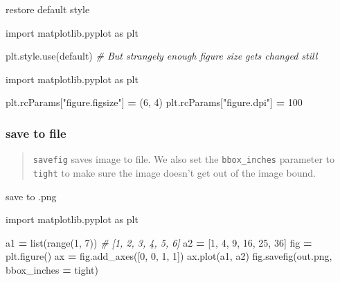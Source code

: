 \documentclass[
]{book}
\newenvironment{Shaded}{\begin{snugshade}}{\end{snugshade}}
\newcommand{\BuiltInTok}[1]{#1}
\newcommand{\CommentTok}[1]{\textcolor[rgb]{0.56,0.35,0.01}{\textit{#1}}}
\newcommand{\DecValTok}[1]{\textcolor[rgb]{0.00,0.00,0.81}{#1}}
\newcommand{\ImportTok}[1]{#1}
\newcommand{\NormalTok}[1]{#1}
\newcommand{\OperatorTok}[1]{\textcolor[rgb]{0.81,0.36,0.00}{\textbf{#1}}}
\newcommand{\StringTok}[1]{\textcolor[rgb]{0.31,0.60,0.02}{#1}}
\theoremstyle{definition}
\theoremstyle{definition}
\theoremstyle{definition}
\theoremstyle{definition}
\theoremstyle{remark}
\begin{document}
restore default style

\begin{Shaded}
\begin{Highlighting}[]
\ImportTok{import}\NormalTok{ matplotlib.pyplot }\ImportTok{as}\NormalTok{ plt}

\NormalTok{plt.style.use(}\StringTok{\textquotesingle{}default\textquotesingle{}}\NormalTok{) }\CommentTok{\# But strangely enough figure size gets changed still}
\end{Highlighting}
\end{Shaded}

\begin{Shaded}
\begin{Highlighting}[]
\ImportTok{import}\NormalTok{ matplotlib.pyplot }\ImportTok{as}\NormalTok{ plt}

\NormalTok{plt.rcParams[}\StringTok{"figure.figsize"}\NormalTok{] }\OperatorTok{=}\NormalTok{ (}\DecValTok{6}\NormalTok{, }\DecValTok{4}\NormalTok{)}
\NormalTok{plt.rcParams[}\StringTok{"figure.dpi"}\NormalTok{] }\OperatorTok{=} \DecValTok{100}
\end{Highlighting}
\end{Shaded}

\hypertarget{save-to-file}{%
\subsubsection{save to file}\label{save-to-file}}

\begin{quote}
\texttt{savefig} saves image to file. We also set the \texttt{bbox\_inches} parameter to \texttt{tight} to make sure the image doesn't get out of the image bound.
\end{quote}

save to .png

\begin{Shaded}
\begin{Highlighting}[]
\ImportTok{import}\NormalTok{ matplotlib.pyplot }\ImportTok{as}\NormalTok{ plt}

\NormalTok{a1 }\OperatorTok{=} \BuiltInTok{list}\NormalTok{(}\BuiltInTok{range}\NormalTok{(}\DecValTok{1}\NormalTok{, }\DecValTok{7}\NormalTok{)) }\CommentTok{\# [1, 2, 3, 4, 5, 6]}
\NormalTok{a2 }\OperatorTok{=}\NormalTok{ [}\DecValTok{1}\NormalTok{, }\DecValTok{4}\NormalTok{, }\DecValTok{9}\NormalTok{, }\DecValTok{16}\NormalTok{, }\DecValTok{25}\NormalTok{, }\DecValTok{36}\NormalTok{]}
\NormalTok{fig }\OperatorTok{=}\NormalTok{ plt.figure()}
\NormalTok{ax }\OperatorTok{=}\NormalTok{ fig.add\_axes([}\DecValTok{0}\NormalTok{, }\DecValTok{0}\NormalTok{, }\DecValTok{1}\NormalTok{, }\DecValTok{1}\NormalTok{])}
\NormalTok{ax.plot(a1, a2)}
\NormalTok{fig.savefig(}\StringTok{\textquotesingle{}out.png\textquotesingle{}}\NormalTok{, bbox\_inches }\OperatorTok{=} \StringTok{\textquotesingle{}tight\textquotesingle{}}\NormalTok{)}
\end{Highlighting}
\end{Shaded}
\end{document}
